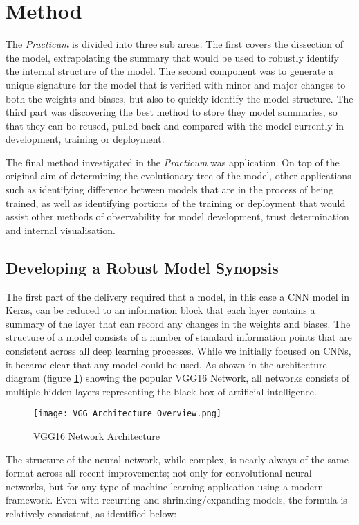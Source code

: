 \section{Method}

The \textit{Practicum} is divided into three sub areas. The first covers the dissection of the model, extrapolating the summary that would be used to robustly identify the internal structure of the model. The second component was to generate a unique signature for the model that is verified with minor and major changes to both the weights and biases, but also to quickly identify the model structure. The third part was discovering the best method to store they model summaries, so that they can be reused, pulled back and compared with the model currently in development, training or deployment.

The final method investigated in the \textit{Practicum} was application. On top of the original aim of determining the evolutionary tree of the model, other applications such as identifying difference between models that are in the process of being trained, as well as identifying portions of the training or deployment that would assist other methods of observability for model development, trust determination and internal visualisation.

\subsection{Developing a Robust Model Synopsis}
The first part of the delivery required that a model, in this case a CNN model in Keras, can be reduced to an information block that each layer contains a summary of the layer that can record any changes in the weights and biases. The structure of a model consists of a number of standard information points that are consistent across all deep learning processes. While we initially focused on CNNs, it became clear that any model could be used. As shown in the architecture diagram (figure \ref{fig:vgg16Architecture}) showing the popular VGG16 Network\cite{simonyanDeepConvolutionalNetworks2014}, all networks consists of multiple hidden layers representing the black-box of artificial intelligence.

\begin{figure}[!ht]
    \centering
    \texttt{[image: VGG Architecture Overview.png]}
    \caption{VGG16 Network Architecture}
    \label{fig:vgg16Architecture}
\end{figure}

The structure of the neural network, while complex, is nearly always of the same format across all recent improvements; not only for convolutional neural networks, but for any type of machine learning application using a modern framework. Even with recurring and shrinking/expanding models, the formula is relatively consistent, as identified below:

